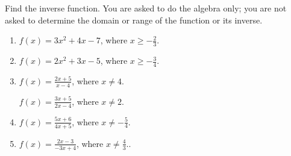 Find the inverse function. You are asked to do the algebra only; you are not asked to determine the domain or range of the function or its inverse. 
\begin{enumerate} [ref={\fcProblemRef}]
\item $f(x)= 3x^2+4x-7$, where $x\geq -\frac{2}{3}$.

\item $f(x)= 2x^2+3x-5$, where $x\geq -\frac{3}{4}$.

\item $\displaystyle f(x)= \frac{2x+5}{x-4}$, where $x\neq 4$.

 \label{problemFindInversef=(3x+5)/(2x-4)} $\displaystyle f(x)= \frac{3x+5}{2x-4}$, where $x\neq 2$.

\item \label{problemFindIversef=(5x+6)/(4x+5)}  $\displaystyle f(x)= \frac{5x+6}{4x+5}$, where $x\neq -\frac{5}{4}$.

\item  $\displaystyle f(x)= \frac{2x-3}{-3x+4}$, where $x\neq \frac{4}{3}$..

\end{enumerate}
